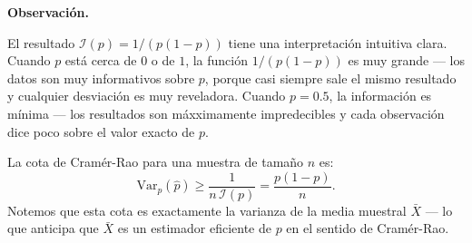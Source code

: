 \documentclass[12pt, a4paper]{book}
\newenvironment{observacion}{%
    \par\medskip\noindent\textbf{\color{azul}Observaci\'{o}n.}\enspace\itshape
}{\par\medskip}
\numberwithin{equation}{chapter}
\begin{document}
\begin{observacion}
	El resultado $\mathcal{I}(p) = 1/(p(1-p))$ tiene una
	interpretaci\'{o}n intuitiva clara. Cuando $p$ est\'{a}
	cerca de $0$ o de $1$, la funci\'{o}n $1/(p(1-p))$
	es muy grande --- los datos son muy informativos sobre
	$p$, porque casi siempre sale el mismo resultado y
	cualquier desviaci\'{o}n es muy reveladora. Cuando
	$p = 0.5$, la informaci\'{o}n es m\'{i}nima ---
	los resultados son m\'{a}xximamente impredecibles y
	cada observaci\'{o}n dice poco sobre el valor exacto
	de $p$.
	
	La cota de Cram\'{e}r-Rao para una muestra de
	tama\~{n}o $n$ es:
	\[
	\mathrm{Var}_p(\hat{p}) \geq
	\frac{1}{n\,\mathcal{I}(p)}
	= \frac{p(1-p)}{n}.
	\]
	Notemos que esta cota es exactamente la varianza de
	la media muestral $\bar{X}$ --- lo que anticipa que
	$\bar{X}$ es un estimador eficiente de $p$ en el
	sentido de Cram\'{e}r-Rao.
\end{observacion}
\end{document}
